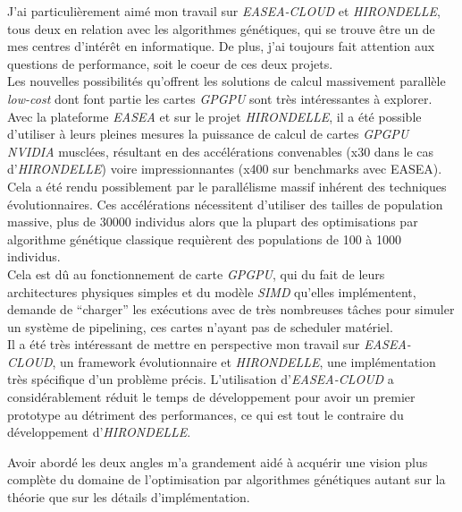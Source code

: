 \documentclass[french, 11pt]{memoir}
\begin{document}
\bigskip
J'ai particulièrement aimé mon travail sur \emph{EASEA-CLOUD} et
\emph{HIRONDELLE}, tous deux en relation avec les algorithmes
génétiques, qui se trouve être un de mes centres d'intérêt en
informatique. De plus, j'ai toujours fait attention aux questions de
performance, soit le coeur de ces deux projets.\\
Les nouvelles possibilités qu'offrent les solutions de calcul
massivement parallèle \emph{low-cost} dont font partie les cartes
\emph{GPGPU} sont très intéressantes à explorer. \\
Avec la plateforme \emph{EASEA} et sur le projet \emph{HIRONDELLE}, il a
été possible d'utiliser à leurs pleines mesures la puissance de calcul
de cartes \emph{GPGPU NVIDIA} musclées, résultant en des accélérations
convenables (x30 dans le cas d'\emph{HIRONDELLE}) voire impressionnantes
(x400 sur benchmarks avec EASEA\cite{maitre2012easea}). \\
Cela a été rendu possiblement par le parallélisme massif inhérent des
techniques évolutionnaires. Ces accélérations nécessitent d'utiliser des
tailles de population massive, plus de 30000 individus alors que la
plupart des optimisations par algorithme génétique classique requièrent
des populations de 100 à 1000 individus. \\
Cela est dû au fonctionnement de carte \emph{GPGPU}, qui du fait de
leurs architectures physiques simples et du modèle \emph{SIMD} qu'elles
implémentent, demande de ``charger'' les exécutions avec de très
nombreuses tâches pour simuler un système de pipelining, ces cartes
n'ayant pas de scheduler matériel\cite{sanders2010cuda}.\\
Il a été très intéressant de mettre en perspective mon travail sur 
\textit{EASEA-CLOUD}, un framework évolutionnaire et \textit{HIRONDELLE}, une
implémentation très spécifique d'un problème précis. L'utilisation
d'\textit{EASEA-CLOUD} a considérablement réduit le temps de développement pour
avoir un premier prototype au détriment des performances, ce qui est
tout le contraire du développement d'\emph{HIRONDELLE}.

\bigskip
Avoir abordé les deux angles m'a grandement aidé à acquérir une vision
plus complète du domaine de l'optimisation par algorithmes génétiques
autant sur la théorie que sur les détails d'implémentation.

\nocite{*}


\end{document}
